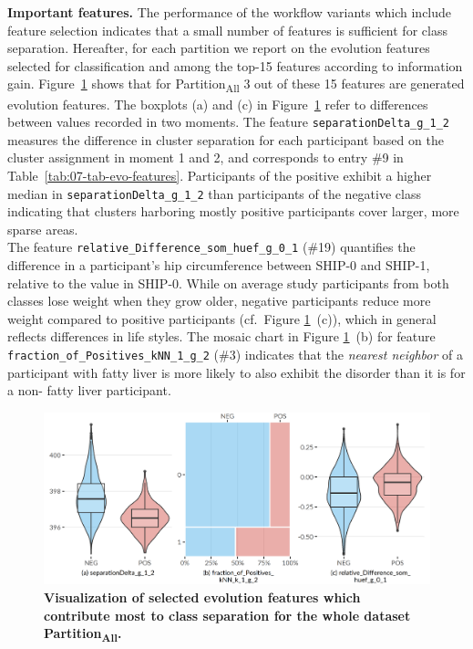 \documentclass[
  oneside]{book}
\begin{document}
\textbf{Important features.} The performance of the workflow variants which include feature selection indicates that a small number of features is sufficient for class separation.
Hereafter, for each partition we report on the evolution features selected for classification and among the top-15 features according to information gain.
Figure~\ref{fig:07-imp-features-all} shows that for Partition\textsubscript{All} 3 out of these 15 features are generated evolution features.
The boxplots (a) and (c) in Figure~\ref{fig:07-imp-features-all} refer to differences between values recorded in two moments.
The feature \texttt{separationDelta\_g\_1\_2} measures the difference in cluster separation for each participant based on the cluster assignment in moment 1 and 2, and corresponds to entry \#9 in Table~\ref{tab:07-tab-evo-features}.
Participants of the positive exhibit a higher median in \texttt{separationDelta\_g\_1\_2} than participants of the negative class indicating that clusters harboring mostly positive participants cover larger, more sparse areas.\\
The feature \texttt{relative\_Difference\_som\_huef\_g\_0\_1} (\#19) quantifies the difference in a participant's hip circumference between SHIP-0 and SHIP-1, relative to the value in SHIP-0.
While on average study participants from both classes lose weight when they grow older, negative participants reduce more weight compared to positive participants (cf.~Figure \ref{fig:07-imp-features-all}~(c)), which in general reflects differences in life styles.
The mosaic chart in Figure \ref{fig:07-imp-features-all}~(b) for feature \texttt{fraction\_of\_Positives\_kNN\_1\_g\_2} (\#3) indicates that the \emph{nearest neighbor} of a participant with fatty liver is more likely to also exhibit the disorder than it is for a non- fatty liver participant.



\begin{figure}

{\centering \includegraphics[width=0.75\linewidth]{figures/07-imp-features-all} 

}

\caption{\textbf{Visualization of selected evolution features which contribute most to class separation for the whole dataset Partition\textsubscript{All}.}}\label{fig:07-imp-features-all}
\end{figure}
\end{document}
